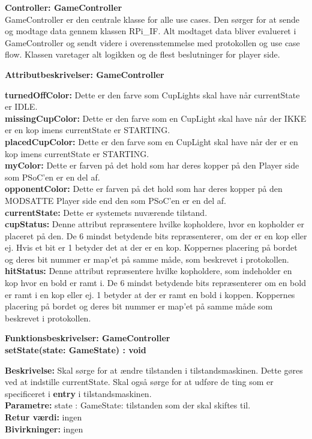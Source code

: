 \documentclass[Arkitektur/System_main.tex]{subfiles}
\begin{document}
{\large\textbf{Controller:  GameController}}\\
GameController er den centrale klasse for alle use cases. Den sørger for at sende og modtage data gennem klassen RPi\_IF. Alt modtaget data bliver evalueret i GameController og sendt videre i overensstemmelse med protokollen og use case flow. Klassen varetager alt logikken og de flest beslutninger for player side. 

{\large\textbf{Attributbeskrivelser: GameController}}
\begin{adjustwidth}{1cm}{0pt}
\textbf{turnedOffColor:} Dette er den farve som CupLights skal have når currentState er IDLE. \\[0.2cm]
\textbf{missingCupColor:} Dette er den farve som en CupLight skal have når der IKKE er en kop imens currentState er STARTING. \\[0.2cm]
\textbf{placedCupColor:} Dette er den farve som en CupLight skal have når der er en kop imens currentState er STARTING. \\[0.2cm]
\textbf{myColor:} Dette er farven på det hold som har deres kopper på den Player side som PSoC'en er en del af.\\[0.2cm]
\textbf{opponentColor:} Dette er farven på det hold som har deres kopper på den MODSATTE Player side end den som PSoC'en er en del af.\\[0.2cm]
\textbf{currentState:} Dette er systemets nuværende tilstand.\\[0.2cm]
\textbf{cupStatus:} Denne attribut repræsentere hvilke kopholdere, hvor en kopholder er placeret på den. De 6 mindst betydende bits repræsenterer, om der er en kop eller ej. Hvis et bit er 1 betyder det at der er en kop. Koppernes placering på bordet og deres bit nummer er map'et på samme måde, som beskrevet i protokollen. \\[0.2cm] 
\textbf{hitStatus:} Denne attribut repræsentere hvilke kopholdere, som indeholder en kop hvor en bold er ramt i. De 6 mindst betydende bits repræsenterer om en bold er ramt i en kop eller ej. 1 betyder at der er ramt en bold i koppen. Koppernes placering på bordet og deres bit nummer er map'et på samme måde som beskrevet i protokollen. \\[0.2cm]

\end{adjustwidth}


    {\large\textbf{Funktionsbeskrivelser: GameController}}\\[0.2cm]
    \textbf{setState(state: GameState) : void}
    \begin{adjustwidth}{1cm}{0pt}
    \textbf{Beskrivelse:} Skal sørge for at ændre tilstanden i tilstandsmaskinen. Dette gøres ved at indstille currentState. Skal også sørge for at udføre de ting som er specificeret i \textbf{entry} i tilstandsmaskinen. \\[0.2cm]
    \textbf{Parametre:} state : GameState: tilstanden som der skal skiftes til. \\[0.2cm]
    \textbf{Retur værdi:} ingen \\[0.2cm]
    \textbf{Bivirkninger:} ingen \\[0.2cm]
    \end{adjustwidth}
    
\end{document}
